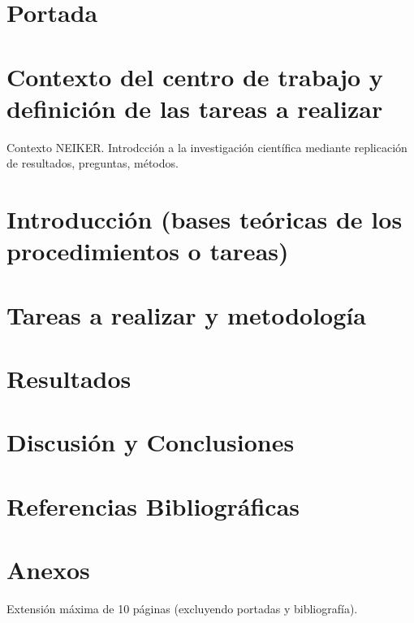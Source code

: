 \documentclass{article}
\begin{document}
\section{Portada}

\section{Contexto del centro de trabajo y definición de las tareas a realizar}

Contexto NEIKER.
Introdcción a la investigación científica mediante replicación de resultados, preguntas, métodos.

\section{Introducción (bases teóricas de los procedimientos o tareas)}



\section{Tareas a realizar y metodología}

\section{Resultados}

\section{Discusión y Conclusiones}

\section{Referencias Bibliográficas}

\section{Anexos}


Extensión máxima de 10 páginas (excluyendo portadas y bibliografía).
\end{document}
